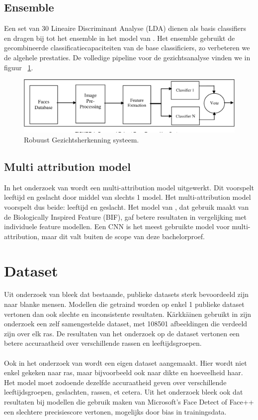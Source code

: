 \subsection{Ensemble}
\label{sub:ensemble}
Een set van 30 Lineaire Discriminant Analyse (LDA) dienen als basis classifiers en dragen bij tot het ensemble in het model van \textcite{Khan2017}. Het ensemble gebruikt de gecombineerde classificatiecapaciteiten van de base classificiers, zo verbeteren we de algehele prestaties. De volledige pipeline voor de gezichtsanalyse vinden we in figuur {~\ref{fig:ensemble}}. 
\begin{figure}
    \centering
    \includegraphics[width=\columnwidth]{graphics/ensemble.png}
    \caption[Robuust gezichtsherkenning systeem]{\label{fig:ensemble}Robuust Gezichtsherkenning systeem\autocite{Khan2017}.}
\end{figure}

\subsection{Multi attribution model}\label{sub:mamodel}
In het onderzoek van \autocite{Gupta2022} wordt een multi-attribution model uitgewerkt. Dit voorspelt leeftijd en geslacht door middel van slechts 1 model. Het multi-attribution model voorspelt dus beide: leeftijd en geslacht. Het model van \autocite{Guo2014}, dat gebruik maakt van de Biologically Inspired Feature (BIF), gaf betere resultaten in vergelijking met individuele feature modellen. Een CNN is het meest gebruikte model voor multi-attribution, maar dit valt buiten de scope van deze bachelorproef.

\section{Dataset} \label{sec:dataset}
Uit onderzoek van \textcite{Karkkainen2021} bleek dat bestaande, publieke datasets sterk bevoordeeld zijn naar blanke mensen. Modellen die getraind worden op enkel 1 publieke dataset vertonen dan ook slechte en inconsistente resultaten. Kärkkäinen gebruikt in zijn onderzoek een zelf samengestelde dataset, met 108501 afbeeldingen die verdeeld zijn over elk ras. De resultaten van het onderzoek op de dataset vertonen een betere accuraatheid over verschillende rassen en leeftijdsgroepen. \\
\\
Ook in het onderzoek van \textcite{Buolamwini2018} wordt een eigen dataset aangemaakt. Hier wordt niet enkel gekeken naar ras, maar bijvoorbeeld ook naar dikte en hoeveelheid haar. Het model moet zodoende dezelfde accuraatheid geven over verschillende leeftijdsgroepen, geslachten, rassen, et cetera. Uit het onderzoek bleek ook dat resultaten bij modellen die gebruik maken van Microsoft's Face Detect of Face++ een slechtere precisiescore vertonen, mogelijks door bias in trainingsdata.


